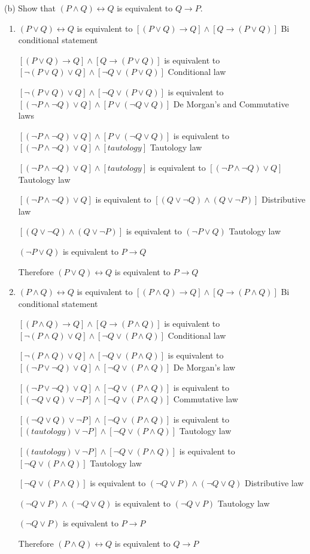 \documentclass{article}
\begin{document}
(b) Show that $(P \land Q) \leftrightarrow Q$ is equivalent to $Q \rightarrow P$.
\begin{enumerate} [label=(\alph*)]
    \item 
    $(P \lor Q) \leftrightarrow Q$ is equivalent to $[(P \lor Q)\rightarrow Q]\land [Q \rightarrow (P \lor Q)]$ Bi conditional statement
    
    $[(P \lor Q)\rightarrow Q]\land [Q \rightarrow (P \lor Q)]$ is equivalent to $[\neg(P \lor Q)\lor Q]\land [\neg Q \lor(P \lor Q)]$ Conditional law
    
    $[\neg(P \lor Q)\lor Q]\land [\neg Q \lor(P \lor Q)]$ is equivalent to $[(\neg P \land \neg Q)\lor Q]\land [P \lor(\neg Q \lor Q)]$ De Morgan's and Commutative laws
    
    $[(\neg P \land \neg Q)\lor Q]\land [P \lor(\neg Q \lor Q)]$ is equivalent to $[(\neg P \land \neg Q)\lor Q]\land [tautology]$ Tautology law
    
    $[(\neg P \land \neg Q)\lor Q]\land [tautology]$ is equivalent to $[(\neg P \land \neg Q)\lor Q]$ Tautology law 
    
    $[(\neg P \land \neg Q)\lor Q]$ is equivalent to $[(Q \lor \neg Q)\land (Q \lor \neg P)]$ Distributive law
    
    $[(Q \lor \neg Q)\land (Q \lor \neg P)]$ is equivalent to $(\neg P \lor Q)$ Tautology law
    
    $(\neg P \lor Q)$ is equivalent to $P \rightarrow Q$
     
    Therefore $(P \lor Q) \leftrightarrow Q$ is equivalent to $P \rightarrow Q$
    \item
    $(P \land Q) \leftrightarrow Q$ is equivalent to $[(P \land Q)\rightarrow Q]\land[Q \rightarrow (P \land Q)]$ Bi conditional statement
    
    $[(P \land Q)\rightarrow Q]\land[Q \rightarrow (P \land Q)]$ is equivalent to $[\neg (P \land Q)\lor Q]\land[\neg Q \lor (P \land Q)]$ Conditional law
    
    $[\neg (P \land Q)\lor Q]\land[\neg Q \lor (P \land Q)]$ is equivalent to $[(\neg P \lor \neg Q)\lor Q]\land[\neg Q \lor (P \land Q)]$ De Morgan's law
    
    $[(\neg P \lor \neg Q)\lor Q]\land[\neg Q \lor (P \land Q)]$ is equivalent to $[(\neg Q \lor Q) \lor \neg P]\land[\neg Q \lor (P \land Q)]$ Commutative law 
    
    $[(\neg Q \lor Q) \lor \neg P]\land[\neg Q \lor (P \land Q)]$ is equivalent to $[(tautology) \lor \neg P]\land[\neg Q \lor (P \land Q)]$ Tautology law
    
    $[(tautology) \lor \neg P]\land[\neg Q \lor (P \land Q)]$ is equivalent to $[\neg Q \lor (P \land Q)]$ Tautology law
    
    $[\neg Q \lor (P \land Q)]$ is equivalent to $(\neg Q \lor P)\land(\neg Q\lor Q)$ Distributive law
    
    $(\neg Q \lor P)\land(\neg Q\lor Q)$ is equivalent to $(\neg Q \lor P)$ Tautology law
    
    $(\neg Q \lor P)$ is equivalent to $P \rightarrow P$
    
    Therefore $(P \land Q) \leftrightarrow Q$ is equivalent to $Q \rightarrow P$
\end{enumerate}
\end{document}
